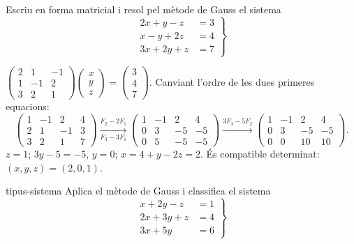 \begin{apartats}

Escriu en forma matricial i resol pel mètode de Gauss el sistema
\[
\left.\begin{aligned}
2x+y-z&=3\\
x-y+2z&=4\\
3x+2y+z&=7
\end{aligned}\right\}
\]

\begin{solucio}
$\begin{pmatrix}2&1&-1\\1&-1&2\\3&2&1\end{pmatrix}\begin{pmatrix}x\\y\\z\end{pmatrix}=\begin{pmatrix}3\\4\\7\end{pmatrix}$.
Canviant l'ordre de les dues primeres equacions:
\[
\left(\begin{array}{ccc|c}1&-1&2&4\\2&1&-1&3\\3&2&1&7\end{array}\right)
\xrightarrow[F_3-3F_1]{F_2-2F_1}
\left(\begin{array}{ccc|c}1&-1&2&4\\0&3&-5&-5\\0&5&-5&-5\end{array}\right)
\xrightarrow{3F_3-5F_2}
\left(\begin{array}{ccc|c}1&-1&2&4\\0&3&-5&-5\\0&0&10&10\end{array}\right).
\]
$z=1$; $3y-5=-5$, $y=0$; $x=4+y-2z=2$. És compatible determinat: $(x,y,z)=(2,0,1)$.
\end{solucio}

\begin{tria}{tipus-sistema}
Aplica el mètode de Gauss i classifica el sistema
\[
\left.\begin{aligned}
x+2y-z&=1\\
2x+3y+z&=4\\
3x+5y&=6
\end{aligned}\right\}
\]


\end{tria}
\end{apartats}
